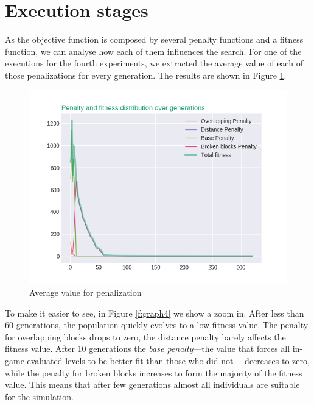 \section{Execution stages}
As the objective function is composed by several penalty functions and a fitness function, we can analyse how each of them influences the search. For one of the executions for the fourth experiments, we extracted the average value of each of those penalizations for every generation. The results are shown in Figure \ref{f:graph3}. 
\begin{figure}[H]
	\centering
	\includegraphics[scale=0.6]{gfx/penalty_evolution_lines.png}
	\caption{Average value for penalization}\label{f:graph3}
\end{figure}

To make it easier to see, in Figure \ref{f:graph4} we show a zoom in. After less than 60 generations, the population quickly evolves to a low fitness value. The penalty for overlapping blocks drops to zero,  the distance penalty barely affects the fitness value. After 10 generations the \textit{base penalty}---the value that forces all in-game evaluated levels to be better fit than those who did not--- decreases to zero, while the penalty for broken blocks increases to form the majority of the fitness value. This means that after few generations almost all individuals are suitable for the simulation.

